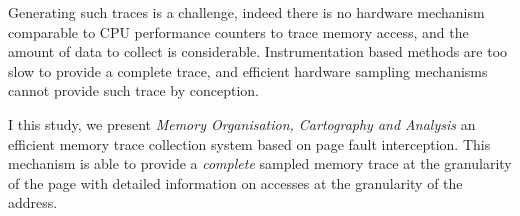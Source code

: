 Generating such traces is a challenge, indeed there is no hardware mechanism
comparable to CPU performance counters to trace memory access, and the amount
of data to collect is considerable. Instrumentation based methods are too slow
to provide a complete trace, and efficient hardware sampling mechanisms cannot
provide such trace by conception.

I this study, we present \emph{Memory Organisation, Cartography and Analysis}
an efficient memory trace collection system based on page fault interception.
This mechanism is able to provide a \emph{complete} sampled memory trace at
the granularity of the page with detailed information on accesses at the
granularity of the address.

